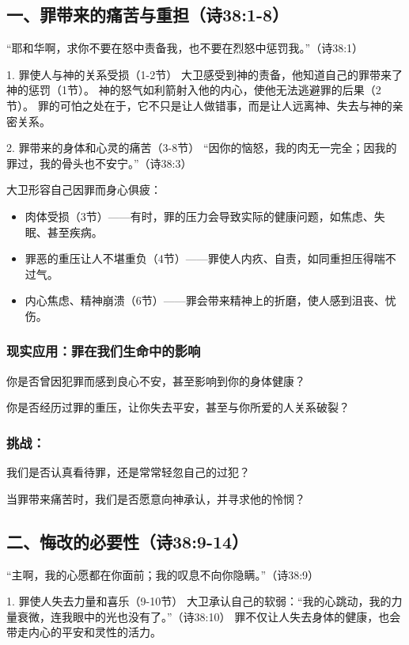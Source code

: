 \documentclass[a4paper, 12pt]{article}
\begin{document}
\subsection*{一、罪带来的痛苦与重担（诗38:1-8）}
“耶和华啊，求你不要在怒中责备我，也不要在烈怒中惩罚我。”（诗38:1）

1. 罪使人与神的关系受损（1-2节）
大卫感受到神的责备，他知道自己的罪带来了神的惩罚（1节）。
神的怒气如利箭射入他的内心，使他无法逃避罪的后果（2节）。
罪的可怕之处在于，它不只是让人做错事，而是让人远离神、失去与神的亲密关系。

2. 罪带来的身体和心灵的痛苦（3-8节）
“因你的恼怒，我的肉无一完全；因我的罪过，我的骨头也不安宁。”（诗38:3）

大卫形容自己因罪而身心俱疲：
\begin{itemize}
    \item 肉体受损（3节）——有时，罪的压力会导致实际的健康问题，如焦虑、失眠、甚至疾病。

    \item 罪恶的重压让人不堪重负（4节）——罪使人内疚、自责，如同重担压得喘不过气。

    \item 内心焦虑、精神崩溃（6节）——罪会带来精神上的折磨，使人感到沮丧、忧伤。

\end{itemize}



\subsubsection*{现实应用：罪在我们生命中的影响}
\hspace{0.6cm}你是否曾因犯罪而感到良心不安，甚至影响到你的身体健康？

你是否经历过罪的重压，让你失去平安，甚至与你所爱的人关系破裂？
\subsubsection*{挑战：}

\hspace{0.6cm}我们是否认真看待罪，还是常常轻忽自己的过犯？

当罪带来痛苦时，我们是否愿意向神承认，并寻求他的怜悯？
\subsection*{二、悔改的必要性（诗38:9-14）}
“主啊，我的心愿都在你面前；我的叹息不向你隐瞒。”（诗38:9）

1. 罪使人失去力量和喜乐（9-10节）
大卫承认自己的软弱：“我的心跳动，我的力量衰微，连我眼中的光也没有了。”（诗38:10）
罪不仅让人失去身体的健康，也会带走内心的平安和灵性的活力。
\end{document}
